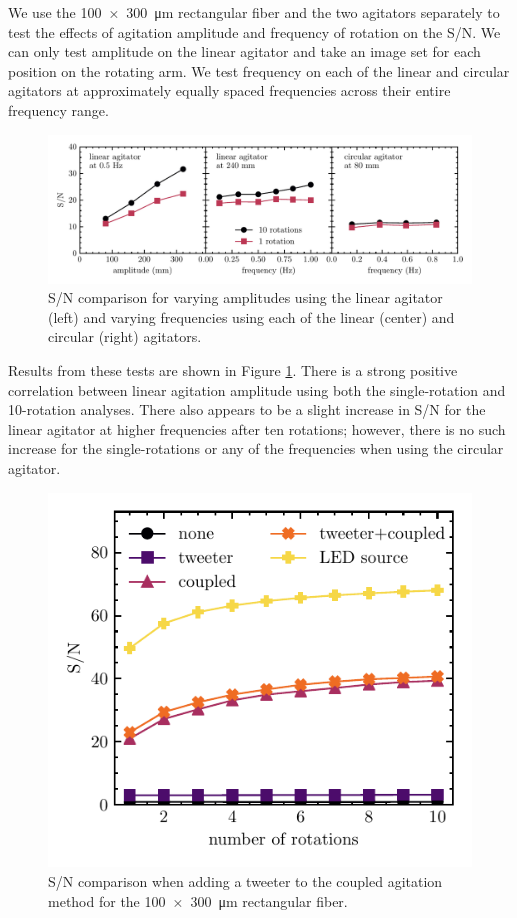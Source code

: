 We use the \SI{100x300}{\micro\meter} rectangular fiber and the two agitators separately to test the effects of agitation amplitude and frequency of rotation on the S/N. We can only test amplitude on the linear agitator and take an image set for each position on the rotating arm. We test frequency on each of the linear and circular agitators at approximately equally spaced frequencies across their entire frequency range.

\begin{figure}
\centering
	\includegraphics[width=\textwidth]{figures-2/amp_freq_snr.pdf}
	\caption[Signal-to-noise comparison across amplitude and mode of agitation]{S/N comparison for varying amplitudes using the linear agitator (left) and varying frequencies using each of the linear (center) and circular (right) agitators.}
\label{fig:amp_freq_snr}
\end{figure}

Results from these tests are shown in Figure \ref{fig:amp_freq_snr}. There is a strong positive correlation between linear agitation amplitude using both the single-rotation and 10-rotation analyses. There also appears to be a slight increase in S/N for the linear agitator at higher frequencies after ten rotations; however, there is no such increase for the single-rotations or any of the frequencies when using the circular agitator.

\begin{figure}
\centering
	\includegraphics[width=0.7\columnwidth]{figures-2/tweeter_snr.pdf}
	\caption[Signal-to-noise comparison with tweeter]{S/N comparison when adding a tweeter to the coupled agitation method for the \SI{100x300}{\micro\meter} rectangular fiber.}
\label{fig:tweeter_snr}
\end{figure}

